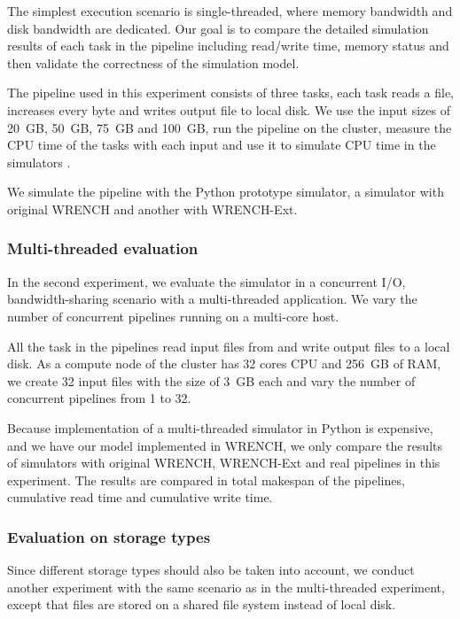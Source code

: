 \documentclass[conference]{IEEEtran}
\begin{document}
			The simplest execution scenario is single-threaded, where memory 
			bandwidth and disk bandwidth are dedicated. Our goal is to 
			compare the detailed simulation results of each task in the pipeline 
			including read/write time, memory status and then validate the correctness 
			of the simulation model. 

			The pipeline used in this experiment consists of three tasks, 
			each task reads a file, increases every byte and writes output file 
			to local disk. 
			We use the input sizes of 20~GB, 50~GB, 75~GB and 100~GB, run 
			the pipeline on the cluster, measure the CPU time of the tasks  
			with each input and use it to simulate CPU time in the simulators .

			We simulate the pipeline with the Python prototype simulator, 
			a simulator with original WRENCH and another with WRENCH-Ext.  
			
			\subsubsection{Multi-threaded evaluation}

			In the second experiment, we evaluate the simulator in a concurrent I/O, 
			bandwidth-sharing scenario with a multi-threaded application. 			
			We vary the number of concurrent pipelines running on a multi-core host.  
			
			All the task in the pipelines read input files from and write output files 
			to a local disk. 
			As a compute node of the cluster has 32 cores CPU and 256~GB of RAM,  
			we create 32 input files with the size of 3~GB each and vary the number of 
			concurrent pipelines from 1 to 32. 
			
			Because implementation of a multi-threaded simulator in Python is 
			expensive, and we have our model implemented in WRENCH, 
			we only compare the results of simulators with original WRENCH, 
			WRENCH-Ext and real pipelines in this experiment. 
			The results are compared in total makespan of the pipelines, 
			cumulative read time and cumulative write time.
			
			\subsubsection{Evaluation on storage types}
			
		    Since different storage types should also be taken into account, 
		    we conduct another experiment with the same scenario as 
		    in the multi-threaded experiment, except that files are stored on a 
		    shared file system instead of local disk. 
		    
\end{document}
